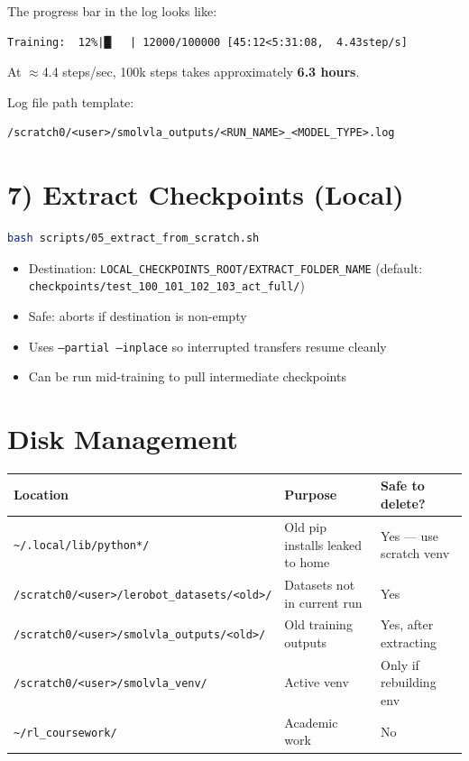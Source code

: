\documentclass[11pt, a4paper]{article}
\begin{document}
The progress bar in the log looks like:
\begin{lstlisting}
Training:  12%|█▏  | 12000/100000 [45:12<5:31:08,  4.43step/s]
\end{lstlisting}

At $\approx$4.4 steps/sec, 100k steps takes approximately \textbf{6.3 hours}.

Log file path template:
\begin{lstlisting}
/scratch0/<user>/smolvla_outputs/<RUN_NAME>_<MODEL_TYPE>.log
\end{lstlisting}

\section{7) Extract Checkpoints (Local)}

\begin{lstlisting}[language=bash]
bash scripts/05_extract_from_scratch.sh
\end{lstlisting}

\begin{itemize}
    \item Destination: \texttt{LOCAL\_CHECKPOINTS\_ROOT/EXTRACT\_FOLDER\_NAME}
          (default: \texttt{checkpoints/test\_100\_101\_102\_103\_act\_full/})
    \item Safe: aborts if destination is non-empty
    \item Uses \texttt{--partial --inplace} so interrupted transfers resume cleanly
    \item Can be run mid-training to pull intermediate checkpoints
\end{itemize}

\section{Disk Management}

\begin{tabular}{lll}
\toprule
\textbf{Location} & \textbf{Purpose} & \textbf{Safe to delete?} \\
\midrule
\texttt{\textasciitilde/.local/lib/python*/} & Old pip installs leaked to home & Yes --- use scratch venv \\
\texttt{/scratch0/<user>/lerobot\_datasets/<old>/} & Datasets not in current run & Yes \\
\texttt{/scratch0/<user>/smolvla\_outputs/<old>/} & Old training outputs & Yes, after extracting \\
\texttt{/scratch0/<user>/smolvla\_venv/} & Active venv & Only if rebuilding env \\
\texttt{\textasciitilde/rl\_coursework/} & Academic work & No \\
\bottomrule
\end{tabular}
\end{document}

